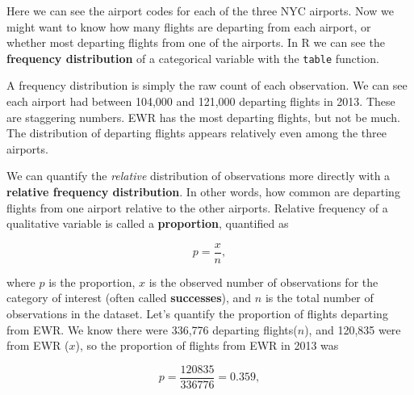 \documentclass[
]{book}
\newenvironment{Shaded}{\begin{snugshade}}{\end{snugshade}}
\newcommand{\DecValTok}[1]{\textcolor[rgb]{0.00,0.00,0.81}{#1}}
\newcommand{\FunctionTok}[1]{\textcolor[rgb]{0.13,0.29,0.53}{\textbf{#1}}}
\newcommand{\NormalTok}[1]{#1}
\newcommand{\SpecialCharTok}[1]{\textcolor[rgb]{0.81,0.36,0.00}{\textbf{#1}}}
\newcommand{\StringTok}[1]{\textcolor[rgb]{0.31,0.60,0.02}{#1}}
\begin{document}
\begin{Shaded}
\end{Shaded}

Here we can see the airport codes for each of the three NYC airports. Now we might want to know how many flights are departing from each airport, or whether most departing flights from one of the airports. In R we can see the \textbf{frequency distribution} of a categorical variable with the \texttt{table} function.

\begin{Shaded}
\end{Shaded}

A frequency distribution is simply the raw count of each observation. We can see each airport had between 104,000 and 121,000 departing flights in 2013. These are staggering numbers. EWR has the most departing flights, but not be much. The distribution of departing flights appears relatively even among the three airports.

We can quantify the \emph{relative} distribution of observations more directly with a \textbf{relative frequency distribution}. In other words, how common are departing flights from one airport relative to the other airports. Relative frequency of a qualitative variable is called a \textbf{proportion}, quantified as

\[
p = \frac{x}{n},
\]

where \(p\) is the proportion, \(x\) is the observed number of observations for the category of interest (often called \textbf{successes}), and \(n\) is the total number of observations in the dataset. Let's quantify the proportion of flights departing from EWR. We know there were 336,776 departing flights(\(n\)), and 120,835 were from EWR (\(x\)), so the proportion of flights from EWR in 2013 was

\[
p = \frac{120835}{336776} = 0.359,
\]
\end{document}

